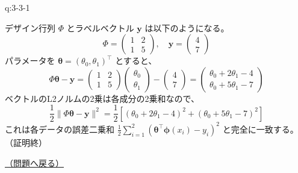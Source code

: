 \begin{answerbox}[phantomlabel=a:3-3-1]{q:3-3-1}

デザイン行列 \(\Phi\) とラベルベクトル \(\mathbf{y}\)
は以下のようになる。 \[
\Phi = \begin{pmatrix} 1 & 2 \\ 1 & 5 \end{pmatrix}, \quad \mathbf{y} = \begin{pmatrix} 4 \\ 7 \end{pmatrix}
\] パラメータを \(\boldsymbol{\theta} = (\theta_0, \theta_1)^\top\)
とすると、 \[
\Phi\boldsymbol{\theta} - \mathbf{y} = \begin{pmatrix} 1 & 2 \\ 1 & 5 \end{pmatrix} \begin{pmatrix} \theta_0 \\ \theta_1 \end{pmatrix} - \begin{pmatrix} 4 \\ 7 \end{pmatrix} = \begin{pmatrix} \theta_0 + 2\theta_1 - 4 \\ \theta_0 + 5\theta_1 - 7 \end{pmatrix}
\] ベクトルのL2ノルムの2乗は各成分の2乗和なので、 \[
\frac{1}{2}\|\Phi\boldsymbol{\theta} - \mathbf{y}\|^2 = \frac{1}{2} \left[ (\theta_0 + 2\theta_1 - 4)^2 + (\theta_0 + 5\theta_1 - 7)^2 \right]
\] これは各データの誤差二乗和
\(\frac{1}{2} \sum_{i=1}^2 (\boldsymbol{\theta}^\top \boldsymbol{\phi}(x_i) - y_i)^2\)
と完全に一致する。（証明終）

\hfill 

\hyperref[q:3-3-1]{（問題へ戻る）}

\end{answerbox}

